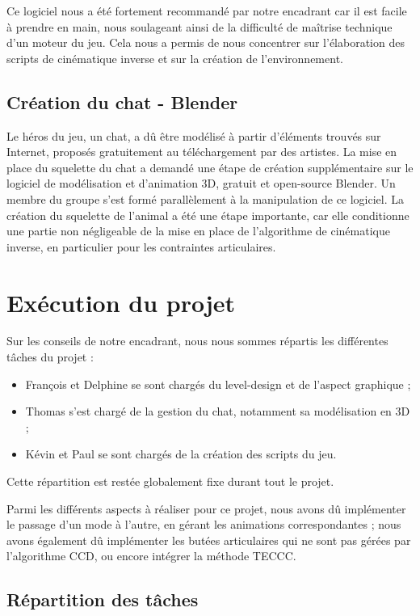 \documentclass[a4paper,11pt]{article}
\begin{document}
Ce logiciel nous a été fortement recommandé par notre encadrant car il est facile à prendre en main, nous soulageant ainsi de la difficulté de maîtrise technique d'un moteur du jeu. Cela nous a permis de nous concentrer sur l'élaboration des scripts de cinématique inverse et sur la création de l'environnement.

\subsection{Création du chat - Blender}

Le héros du jeu, un chat, a dû être modélisé à partir d'éléments trouvés sur Internet, proposés gratuitement au téléchargement par des artistes. La mise en place du squelette du chat a demandé une étape de création supplémentaire sur le logiciel de modélisation et d'animation 3D, gratuit et open-source Blender. Un membre du groupe s'est formé parallèlement à la manipulation de ce logiciel. La création du squelette de l'animal a été une étape importante, car elle conditionne une partie non négligeable de la mise en place de l'algorithme de cinématique inverse, en particulier pour les contraintes articulaires. 

\section{Exécution du projet}
Sur les conseils de notre encadrant, nous nous sommes répartis les différentes tâches du projet : 
\begin{itemize}
\item François et Delphine se sont chargés du level-design et de l'aspect graphique ;
\item Thomas s'est chargé de la gestion du chat, notamment sa modélisation en 3D ;
\item Kévin et Paul se sont chargés de la création des scripts du jeu.
\end{itemize}
Cette répartition est restée globalement fixe durant tout le projet.

Parmi les différents aspects à réaliser pour ce projet, nous avons dû implémenter le passage d'un mode à l'autre, en gérant les animations correspondantes ; nous avons également dû implémenter les butées articulaires qui ne sont pas gérées par l'algorithme CCD, ou encore intégrer la méthode TECCC. 


\subsection{Répartition des tâches}
\end{document}
